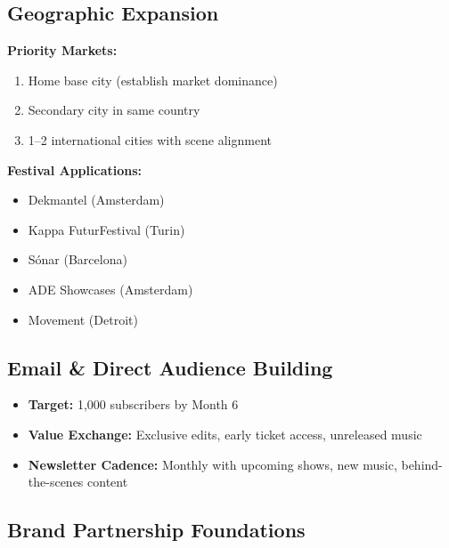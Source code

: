 \documentclass[11pt,a4paper]{article}
\begin{document}
\subsection{Geographic Expansion}

\noindent\textbf{Priority Markets:}
\begin{enumerate}[leftmargin=*]
    \item Home base city (establish market dominance)
    \item Secondary city in same country
    \item 1--2 international cities with scene alignment
\end{enumerate}

\noindent\textbf{Festival Applications:}
\begin{itemize}[leftmargin=*]
    \item Dekmantel (Amsterdam)
    \item Kappa FuturFestival (Turin)
    \item Sónar (Barcelona)
    \item ADE Showcases (Amsterdam)
    \item Movement (Detroit)
\end{itemize}

\subsection{Email \& Direct Audience Building}

\begin{itemize}[leftmargin=*]
    \item \textbf{Target:} 1,000 subscribers by Month 6
    \item \textbf{Value Exchange:} Exclusive edits, early ticket access, unreleased music
    \item \textbf{Newsletter Cadence:} Monthly with upcoming shows, new music, behind-the-scenes content
\end{itemize}

\subsection{Brand Partnership Foundations}
\end{document}
